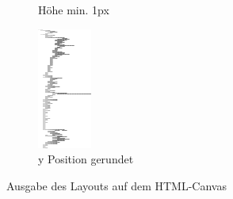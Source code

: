 \documentclass[nobib, nohyper, a4paper,openany]{tufte-book}
\begin{document}
\begin{figure}
\begin{subfigure}[b]{0.3\textwidth}
    \caption{Höhe min. 1px}
    \label{fig:map:midmin}
  \end{subfigure}
  \begin{subfigure}[b]{0.3\textwidth}
    \includegraphics[width=\textwidth]{figures/treegraphs/midcount_minheight_rounded.png}
    \caption{y Position gerundet}
    \label{fig:map:midminround}
  \end{subfigure}
  \caption{Ausgabe des Layouts auf dem HTML-Canvas}
\end{figure}
\end{document}

